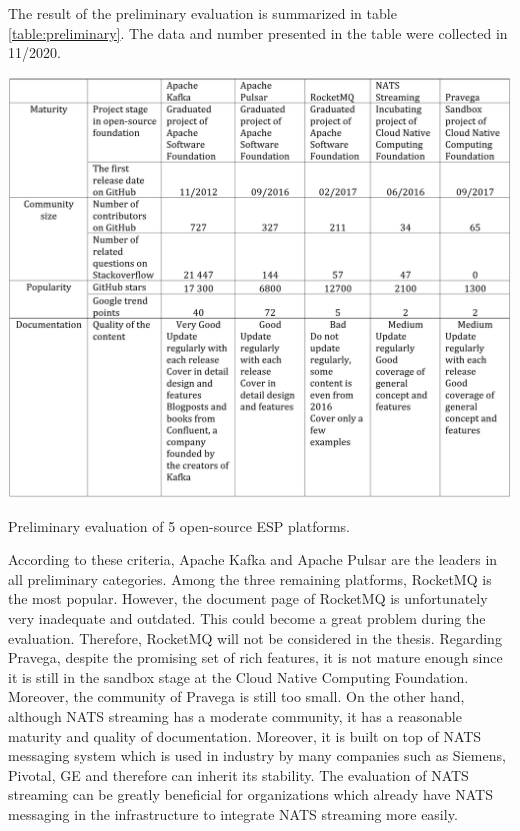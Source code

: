 The result of the preliminary evaluation is summarized in table \ref{table:preliminary}. The data and number presented in the table were collected in 11/2020.

\begin{table}[h]
	\includegraphics[width=\linewidth]{images/preliminary}
	\caption{Preliminary evaluation of 5 open-source ESP platforms.}
	\label{table:preliminary}
\end{table}

According to these criteria, Apache Kafka and Apache Pulsar are the leaders in all preliminary categories. Among the three remaining platforms, RocketMQ is the most popular. However, the document page of RocketMQ is unfortunately very inadequate and outdated. This could become a great problem during the evaluation.  Therefore, RocketMQ will not be considered in the thesis. Regarding Pravega, despite the promising set of rich features, it is not mature enough since it is still in the sandbox stage at the Cloud Native Computing Foundation. Moreover, the community of Pravega is still too small. On the other hand, although NATS streaming has a moderate community, it has a reasonable maturity and quality of documentation. Moreover, it is built on top of NATS messaging system which is used in industry by many companies such as Siemens, Pivotal, GE and therefore can inherit its stability. The evaluation of NATS streaming can be greatly beneficial for organizations which already have NATS messaging in the infrastructure to integrate NATS streaming more easily.

